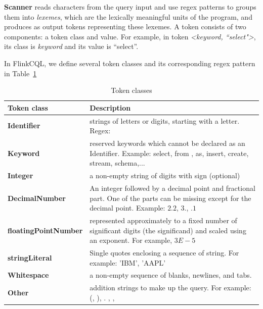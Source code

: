\textbf{Scanner} reads characters from the query input and use regex patterns to groups them into \textit{lexemes}, which are the lexically meaningful units of the program, and produces as output tokens representing these lexemes. A token consists of two components: a token class and value. For example, in token \textit{<keyword, ``select">}, its class is \textit{keyword} and its value is ``select''. 

In FlinkCQL, we define several token classes and its corresponding regex pattern in Table~\ref{table:TokenClass}


\begin{table}[h]
\caption{Token classes}
\centering
\label{table:TokenClass}
\setlength\extrarowheight{5pt}
\begin{tabular}{||>{\centering\bfseries}m{2in}   |>{\centering\arraybackslash}m{3in}||}
\hline
\textbf{Token class} & \textbf{Description} \\ \hline\hline
                 Identifier  & strings of letters or digits, starting with a letter. Regex: 
                                \\ \hline
                   Keyword	  & reserved keywords which cannot be declared as an Identifier. Example: select, from , as, insert, create, stream, schema,... \\ \hline
                   Integer		& a non-empty string of digits with sign (optional) \\ \hline %
				   DecimalNumber		&  An integer followed by a decimal point and fractional part. One of the parts can be missing except for the decimal point. Example: $2.2$, $3.$, $.1$   \\ \hline %
					floatingPointNumber	& represented approximately to a fixed number of significant digits (the significand) and scaled using an exponent. For example, $3E-5$			               \\ \hline		%
					stringLiteral		& Single quotes enclosing a sequence of string. For example: 'IBM', 'AAPL'			 \\ \hline
					Whitespace		& a non-empty sequence of blanks, newlines, and tabs.	 		                      \\ \hline								
					Other	& addition strings to make up the query. For example: (, ), . , {, }		                     \\ \hline							           							           							           							           
\end{tabular}
\end{table}


